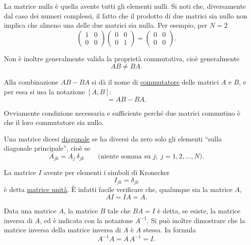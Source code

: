 \documentclass[11pt, a4paper]{book}
\numberwithin{equation}{section}
\begin{document}
La matrice nulla è quella avente tutti gli elementi nulli. Si noti che, diversamente dal caso dei numeri complessi, il fatto che il prodotto di due matrici sia nullo non implica che almeno una delle due matrici sia nulla. Per esempio, per $N = 2$
\[
\begin{pmatrix} 1 & 0 \\ 0 & 0 \end{pmatrix}
\begin{pmatrix} 0 & 0 \\ 0 & 1 \end{pmatrix}
=
\begin{pmatrix} 0 & 0 \\ 0 & 0 \end{pmatrix}.
\]

Non è inoltre generalmente valida la proprietà commutativa, cioè generalmente
\begin{equation}
    AB \neq BA.
    \tag{13}
\end{equation}

Alla combinazione $AB - BA$ si dà il nome di \uline{commutatore} delle matrici $A$ e $B$, e per essa si usa la notazione $[A, B]$:
\begin{equation}
    [A, B] = AB - BA.
    \tag{14}
\end{equation}

Ovviamente condizione necessaria e sufficiente perché due matrici commutino è che il loro commutatore sia nullo.

Una matrice dicesi \uline{diagonale} se ha diversi da zero solo gli elementi ``sulla diagonale principale'', cioè se
\begin{equation}
    A_{jk} = A_j\, \delta_{jk} \qquad \text{(niente somma su } j;\; j = 1, 2, \ldots, N\text{)}.
    \tag{15}
\end{equation}

La matrice $I$ avente per elementi i simboli di Kronecker
\begin{equation}
    I_{jk} = \delta_{jk}
    \tag{16}
\end{equation}
è detta \uline{matrice unità}. È infatti facile verificare che, qualunque sia la matrice $A$,
\begin{equation}
    AI = IA = A.
    \tag{17}
\end{equation}

Data una matrice $A$, la matrice $B$ tale che $BA = I$ è detta, se esiste, la matrice inversa di $A$, ed è indicata con la notazione $A^{-1}$. Si può inoltre dimostrare che la matrice inversa della matrice inversa di $A$ è $A$ stessa. In formula
\begin{equation}
    A^{-1} A = A\, A^{-1} = I.
    \tag{18}
\end{equation}
\end{document}
